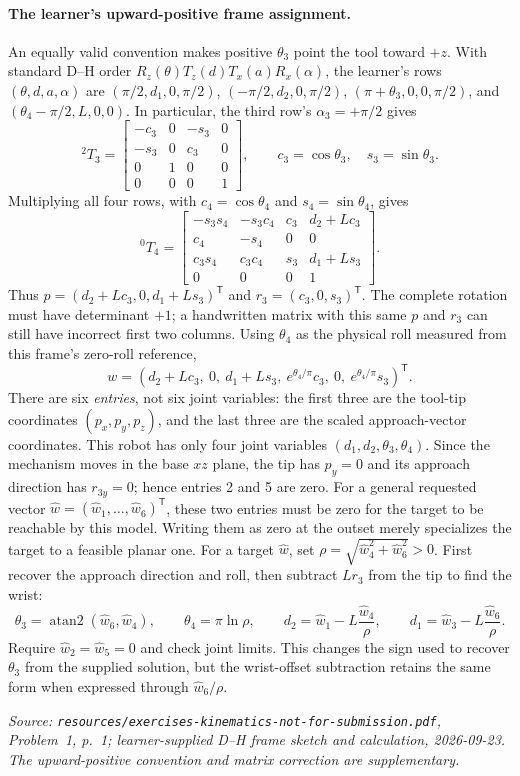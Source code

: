 \documentclass[11pt,a4paper]{article}
\renewcommand{\texttt}[1]{\nolinkurl{#1}}
\newcommand{\trans}{\mathsf{T}}
\newcommand{\source}[1]{\par\smallskip\noindent\textit{Source: #1.}\par\smallskip}
\begin{document}
\paragraph{The learner's upward-positive frame assignment.}
An equally valid convention makes positive $\theta_3$ point the tool toward $+z$.
With standard D--H order $R_z(\theta)T_z(d)T_x(a)R_x(\alpha)$, the learner's rows
$(\theta,d,a,\alpha)$ are
$(\pi/2,d_1,0,\pi/2)$, $(-\pi/2,d_2,0,\pi/2)$,
$(\pi+\theta_3,0,0,\pi/2)$, and $(\theta_4-\pi/2,L,0,0)$.
In particular, the third row's $\alpha_3=+\pi/2$ gives
\[
 {}^2T_3=\begin{bmatrix}
 -c_3&0&-s_3&0\\
 -s_3&0& c_3&0\\
 0&1&0&0\\
 0&0&0&1
 \end{bmatrix},
 \qquad c_3=\cos\theta_3,\quad s_3=\sin\theta_3.
\]
Multiplying all four rows, with $c_4=\cos\theta_4$ and $s_4=\sin\theta_4$, gives
\[
 {}^0T_4=\begin{bmatrix}
 -s_3s_4&-s_3c_4&c_3&d_2+Lc_3\\
 c_4&-s_4&0&0\\
 c_3s_4&c_3c_4&s_3&d_1+Ls_3\\
 0&0&0&1
 \end{bmatrix}.
\]
Thus $p=(d_2+Lc_3,0,d_1+Ls_3)^\trans$ and $r_3=(c_3,0,s_3)^\trans$.
The complete rotation must have determinant $+1$;
a handwritten matrix with this same $p$ and $r_3$ can still have incorrect first two columns.
Using $\theta_4$ as the physical roll measured from this frame's zero-roll reference,
\[
 w=(d_2+Lc_3,\ 0,\ d_1+Ls_3,\ e^{\theta_4/\pi}c_3,\ 0,\ e^{\theta_4/\pi}s_3)^\trans.
\]
There are six \emph{entries}, not six joint variables: the first three are the
tool-tip coordinates $(p_x,p_y,p_z)$, and the last three are the scaled
approach-vector coordinates. This robot has only four joint variables
$(d_1,d_2,\theta_3,\theta_4)$. Since the mechanism moves in the base $xz$ plane,
the tip has $p_y=0$ and its approach direction has $r_{3y}=0$; hence entries
2 and 5 are zero. For a general requested vector
$\widehat w=(\widehat w_1,\ldots,\widehat w_6)^\trans$, these two entries
must be zero for the target to be reachable by this model. Writing them as
zero at the outset merely specializes the target to a feasible planar one.
For a target $\widehat w$, set $\rho=\sqrt{\widehat w_4^2+\widehat w_6^2}>0$.
First recover the approach direction and roll, then subtract $Lr_3$ from the tip to find the wrist:
\[
 \theta_3=\operatorname{atan2}(\widehat w_6,\widehat w_4),\qquad
 \theta_4=\pi\ln\rho,\qquad
 d_2=\widehat w_1-L\frac{\widehat w_4}{\rho},\qquad
 d_1=\widehat w_3-L\frac{\widehat w_6}{\rho}.
\]
Require $\widehat w_2=\widehat w_5=0$ and check joint limits. This changes
the sign used to recover $\theta_3$ from the supplied solution, but the wrist-offset
subtraction retains the same form when expressed through $\widehat w_6/\rho$.
\source{\texttt{resources/exercises-kinematics-not-for-submission.pdf}, Problem~1, p.~1; learner-supplied D--H frame sketch and calculation, 2026-09-23. The upward-positive convention and matrix correction are supplementary}
\end{document}
